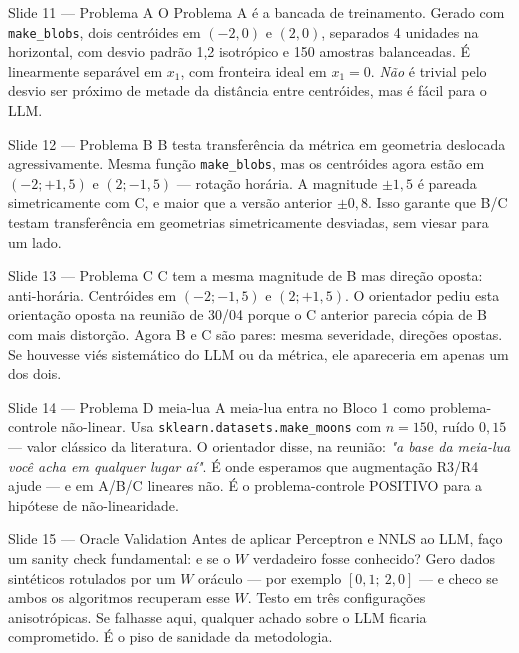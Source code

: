 \documentclass[aspectratio=169,10pt]{beamer}
\begin{document}
\begin{frame}{Slide 11 --- Problema A}
\footnotesize
O Problema A \'e a bancada de treinamento. Gerado com \texttt{make\_blobs}, dois centr\'oides em $(-2, 0)$ e $(2, 0)$, separados 4 unidades na horizontal, com desvio padr\~ao 1{,}2 isotr\'opico e 150 amostras balanceadas. \'E linearmente separ\'avel em $x_1$, com fronteira ideal em $x_1=0$. \emph{N\~ao} \'e trivial pelo desvio ser pr\'oximo de metade da dist\^ancia entre centr\'oides, mas \'e f\'acil para o LLM.
\end{frame}

\begin{frame}{Slide 12 --- Problema B}
\footnotesize
B testa transfer\^encia da m\'etrica em geometria deslocada agressivamente. Mesma fun\c{c}\~ao \texttt{make\_blobs}, mas os centr\'oides agora est\~ao em $(-2; +1{,}5)$ e $(2; -1{,}5)$ --- rota\c{c}\~ao hor\'aria. A magnitude $\pm 1{,}5$ \'e pareada simetricamente com C, e maior que a vers\~ao anterior $\pm 0{,}8$. Isso garante que B/C testam transfer\^encia em geometrias simetricamente desviadas, sem viesar para um lado.
\end{frame}

\begin{frame}{Slide 13 --- Problema C}
\footnotesize
C tem a mesma magnitude de B mas dire\c{c}\~ao oposta: anti-hor\'aria. Centr\'oides em $(-2; -1{,}5)$ e $(2; +1{,}5)$. O orientador pediu esta orienta\c{c}\~ao oposta na reuni\~ao de 30/04 porque o C anterior parecia c\'opia de B com mais distor\c{c}\~ao. Agora B e C s\~ao pares: mesma severidade, dire\c{c}\~oes opostas. Se houvesse vi\'es sistem\'atico do LLM ou da m\'etrica, ele apareceria em apenas um dos dois.
\end{frame}

\begin{frame}{Slide 14 --- Problema D meia-lua}
\footnotesize
A meia-lua entra no Bloco 1 como problema-controle n\~ao-linear. Usa \texttt{sklearn.datasets.make\_moons} com $n=150$, ru\'ido $0{,}15$ --- valor cl\'assico da literatura. O orientador disse, na reuni\~ao: \emph{"a base da meia-lua voc\^e acha em qualquer lugar a\'i"}. \'E onde esperamos que augmenta\c{c}\~ao R3/R4 ajude --- e em A/B/C lineares n\~ao. \'E o problema-controle POSITIVO para a hip\'otese de n\~ao-linearidade.
\end{frame}

\begin{frame}{Slide 15 --- Oracle Validation}
\footnotesize
Antes de aplicar Perceptron e NNLS ao LLM, fa\c{c}o um sanity check fundamental: e se o $W$ verdadeiro fosse conhecido? Gero dados sint\'eticos rotulados por um $W$ or\'aculo --- por exemplo $[0{,}1;\ 2{,}0]$ --- e checo se ambos os algoritmos recuperam esse $W$. Testo em tr\^es configura\c{c}\~oes anisotr\'opicas. Se falhasse aqui, qualquer achado sobre o LLM ficaria comprometido. \'E o piso de sanidade da metodologia.
\end{frame}
\end{document}
